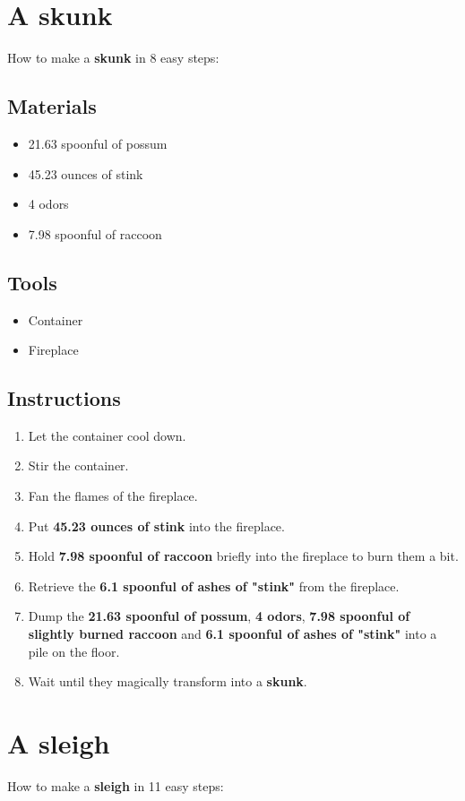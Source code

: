 \documentclass{article}
\begin{document}
\section{A skunk}How to make a \textbf{skunk} in 8 easy steps:

\subsection{Materials}\begin{itemize}
\item 
21.63 spoonful of possum
\item 
45.23 ounces of stink
\item 
4 odors
\item 
7.98 spoonful of raccoon
\end{itemize}
\subsection{Tools}\begin{itemize}
\item 
Container
\item 
Fireplace
\end{itemize}
\subsection{Instructions}\begin{enumerate}
\item 
Let the container cool down.
\item 
Stir the container.
\item 
Fan the flames of the fireplace.
\item 
Put \textbf{45.23 ounces of stink} into the fireplace.
\item 
Hold \textbf{7.98 spoonful of raccoon} briefly into the fireplace to burn them a bit.
\item 
Retrieve the \textbf{6.1 spoonful of ashes of "stink"} from the fireplace.
\item 
Dump the \textbf{21.63 spoonful of possum}, \textbf{4 odors}, \textbf{7.98 spoonful of slightly burned raccoon} and \textbf{6.1 spoonful of ashes of "stink"} into a pile on the floor.
\item 
Wait until they magically transform into a \textbf{skunk}.
\end{enumerate}
\newpage
\section{A sleigh}How to make a \textbf{sleigh} in 11 easy steps:
\end{document}
